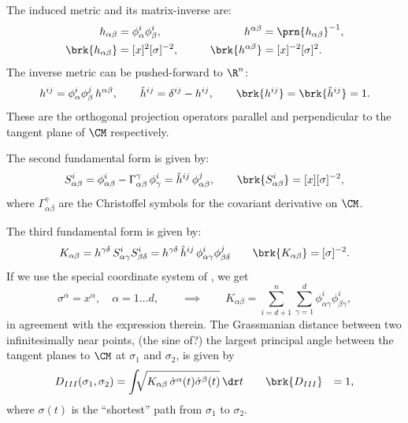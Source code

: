 \documentclass[12pt]{article}
\newcommand{\inv}{^{-1}}
\newcommand{\invsq}{^{-2}}
\begin{document}
The induced metric and its matrix-inverse are:
%
\begin{equation}\label{eq:inducedmet}
\begin{aligned}
  h_{\alpha\beta} &= \phi^i_\alpha \phi^i_\beta, \qquad&
  h^{\alpha\beta} &= \prn{h_{\alpha\beta}}\inv, \\
  \brk{h_{\alpha\beta}} &= [x]^2[\sigma]\invsq, \qquad&
  \brk{h^{\alpha\beta}} &= [x]\invsq[\sigma]^2. \\
\end{aligned}
\end{equation}
%
The inverse metric can be pushed-forward to $\R^n$:
%
\begin{equation}\label{eq:proj}
  h^{ij} = \phi^i_\alpha \phi^j_\beta \, h^{\alpha\beta}, \qquad
  \tilde{h}^{ij} = \delta^{ij} - h^{ij}, \qquad
  \brk{h^{ij}} = \brk{ \tilde{h}^{ij}} = 1.
\end{equation}
%
These are the orthogonal projection operators parallel and perpendicular to the tangent plane of $\CM$ respectively.

The second fundamental form is given by:
%
\begin{equation}\label{eq:extcurvtensor}
  S^i_{\alpha\beta} = \phi^i_{\alpha\beta} - \Gamma^\gamma_{\alpha\beta} \, \phi^i_\gamma
                    = \tilde{h}^{ij} \, \phi^j_{\alpha\beta},
  \qquad
  \brk{S^i_{\alpha\beta}} = [x][\sigma]\invsq,
\end{equation}
%
where $\Gamma^\gamma_{\alpha\beta}$ are the Christoffel symbols for the covariant derivative on $\CM$.

The third fundamental form is given by:
%
\begin{equation}\label{eq:grassmet}
  K_{\alpha\beta} = h^{\gamma\delta} \,  S^i_{\alpha\gamma} S^i_{\beta\delta}
                  = h^{\gamma\delta} \, \tilde{h}^{ij} \, \phi^i_{\alpha\gamma} \phi^j_{\beta\delta}
  \qquad
  \brk{K_{\alpha\beta}}=[\sigma]\invsq.
\end{equation}
%
If we use the special coordinate system of \cite[Appendix B]{clarkson2008tighter}, we get
%
\begin{equation}\label{eq:specialcoord}
  \sigma^\alpha = x^\alpha, \quad \alpha=1\ldots d,
  \qquad \implies \qquad
  K_{\alpha\beta} = \sum_{i=d+1}^n \sum_{\gamma=1}^d \phi^i_{\alpha\gamma} \phi^i_{\beta\gamma},
\end{equation}
%
in agreement with the expression therein.
The Grassmanian distance between two infinitesimally near points, \ie (the sine of?) the largest principal angle between the tangent planes to $\CM$ at $\sigma_1$ and $\sigma_2$, is given by
%
\begin{equation}\label{eq:grass_dist_explicit}
\begin{aligned}
  D_{III}(\sigma_1,\sigma_2) &= \int\!\!\! \sqrt{K_{\alpha\beta} \, \dot{\sigma}^\alpha(t)\dot{\sigma}^\beta(t)}\, \dr t %
\qquad
  \brk{D_{III}}&=1,
\end{aligned}
\end{equation}
%
where $\sigma(t)$ is the ``shortest'' path from $\sigma_1$ to $\sigma_2$.
\end{document}
